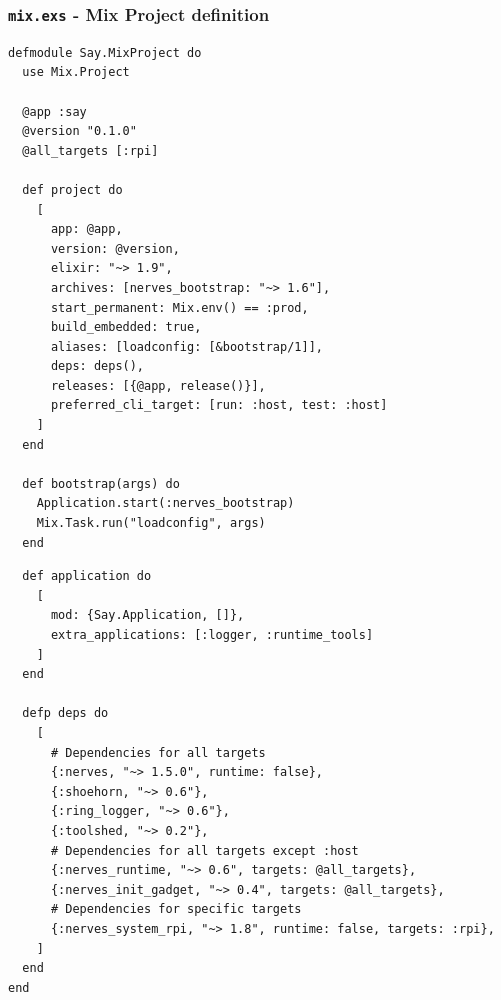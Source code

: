 \documentclass[10pt,xcolor=pdflatex,dvipsnames,table]{beamer}
\begin{document}
\begin{frame}[fragile]
\frametitle{\texttt{mix.exs} - Mix Project definition}

\begin{overprint}
\begin{verbatim}
defmodule Say.MixProject do
  use Mix.Project

  @app :say
  @version "0.1.0"
  @all_targets [:rpi]

  def project do
    [
      app: @app,
      version: @version,
      elixir: "~> 1.9",
      archives: [nerves_bootstrap: "~> 1.6"],
      start_permanent: Mix.env() == :prod,
      build_embedded: true,
      aliases: [loadconfig: [&bootstrap/1]],
      deps: deps(),
      releases: [{@app, release()}],
      preferred_cli_target: [run: :host, test: :host]
    ]
  end

  def bootstrap(args) do
    Application.start(:nerves_bootstrap)
    Mix.Task.run("loadconfig", args)
  end
\end{verbatim}


\begin{verbatim}
  def application do
    [
      mod: {Say.Application, []},
      extra_applications: [:logger, :runtime_tools]
    ]
  end

  defp deps do
    [
      # Dependencies for all targets
      {:nerves, "~> 1.5.0", runtime: false},
      {:shoehorn, "~> 0.6"},
      {:ring_logger, "~> 0.6"},
      {:toolshed, "~> 0.2"},
      # Dependencies for all targets except :host
      {:nerves_runtime, "~> 0.6", targets: @all_targets},
      {:nerves_init_gadget, "~> 0.4", targets: @all_targets},
      # Dependencies for specific targets
      {:nerves_system_rpi, "~> 1.8", runtime: false, targets: :rpi},
    ]
  end
end
\end{verbatim}
\end{overprint}
\end{frame}
\end{document}
